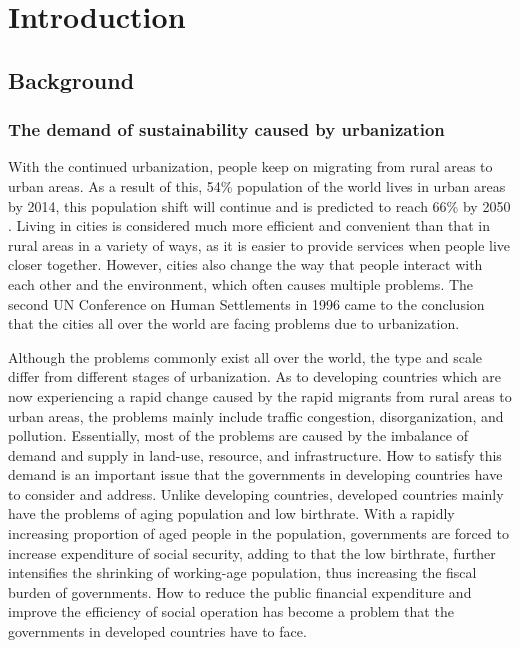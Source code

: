 \chapter{Introduction}

%
\section{Background}

\subsection{The demand of sustainability caused by urbanization}
With the continued urbanization, people keep on migrating from rural areas to urban areas. As a result of this, 54\% population of the world lives in urban areas by 2014, this population shift will continue and is predicted to reach 66\% by 2050 \cite{un2014world}. Living in cities is considered much more efficient and convenient than that in rural areas in a variety of ways, as it is easier to provide services when people live closer together. However, cities also change the way that people interact with each other and the environment, which often causes multiple problems. The second UN Conference on Human Settlements in 1996 came to the conclusion that the cities all over the world are facing problems due to urbanization.

Although the problems commonly exist all over the world, the type and scale differ from different stages of urbanization. As to developing countries which are now experiencing a rapid change caused by the rapid migrants from rural areas to urban areas, the problems mainly include traffic congestion, disorganization, and pollution. Essentially, most of the problems are caused by the imbalance of demand and supply in land-use, resource, and infrastructure. How to satisfy this demand is an important issue that the governments in developing countries have to consider and address. Unlike developing countries, developed countries mainly have the problems of aging population and low birthrate. With a rapidly increasing proportion of aged people in the population, governments are forced to increase expenditure of social security, adding to that the low birthrate, further intensifies the shrinking of working-age population, thus increasing the fiscal burden of governments. How to reduce the public financial expenditure and improve the efficiency of social operation has become a problem that the governments in developed countries have to face. 

